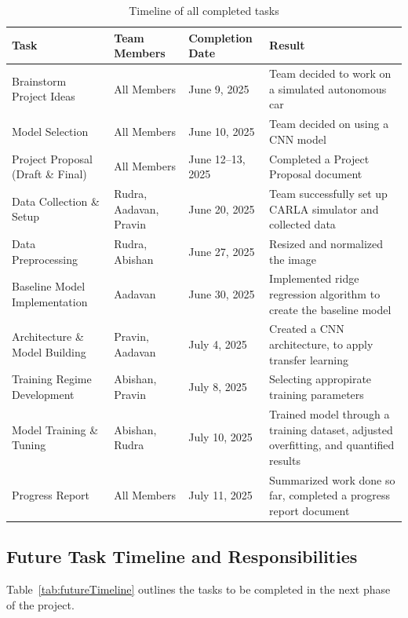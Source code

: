 \documentclass{article} %
\begin{document}
\begin{table}[h!]
\centering
\caption{Timeline of all completed tasks}
\begin{tabular}{|p{2.5cm}|p{3cm}|p{3cm}|p{5.5cm}|}
\hline
\textbf{Task} & \textbf{Team Members} & \textbf{Completion Date} & \textbf{Result} \\
\hline
Brainstorm Project Ideas & All Members & June 9, 2025 & Team decided to work on a simulated autonomous car \\
\hline
Model Selection & All Members & June 10, 2025 & Team decided on using a CNN model \\
\hline
Project Proposal (Draft \& Final) & All Members & June 12--13, 2025 & Completed a Project Proposal document \\
\hline
Data Collection \& Setup & Rudra, Aadavan, Pravin & June 20, 2025 & Team successfully set up CARLA simulator and collected data \\
\hline
Data Preprocessing & Rudra, Abishan & June 27, 2025 & Resized and normalized the image \\
\hline
Baseline Model Implementation & Aadavan & June 30, 2025 & Implemented ridge regression algorithm to create the baseline model \\
\hline
Architecture \& Model Building & Pravin, Aadavan & July 4, 2025 & Created a CNN architecture, to apply transfer learning \\
\hline
Training Regime Development & Abishan, Pravin & July 8, 2025 & Selecting appropirate training parameters \\
\hline
Model Training \& Tuning & Abishan, Rudra & July 10, 2025 & Trained model through a training dataset, adjusted overfitting, and quantified results \\
\hline
Progress Report & All Members & July 11, 2025 & Summarized work done so far, completed a progress report document \\
\hline
\end{tabular}
\label{tab:currentTimeline}
\end{table}

\subsection{Future Task Timeline and Responsibilities}

Table~\ref{tab:futureTimeline} outlines the tasks to be completed in the next phase of the project.
\end{document}
